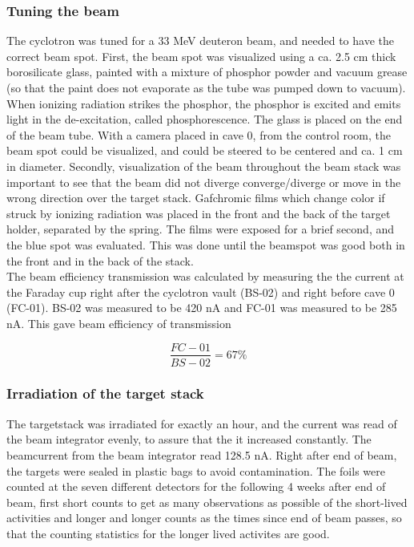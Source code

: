 \documentclass[a4paper,11pt,twoside]{book}
\begin{document}
\subsubsection{Tuning the beam}
The cyclotron was tuned for a 33 MeV deuteron beam, and needed to have the correct beam spot. First, the beam spot was visualized using a ca. 2.5 cm thick borosilicate glass, painted with a mixture of phosphor powder and vacuum grease (so that the paint does not evaporate as the tube was pumped down to vacuum). When ionizing radiation strikes the phosphor, the phosphor is excited and emits light in the de-excitation, called phosphorescence.  The glass is placed on the end of the beam tube. With a camera placed in cave 0, from the control room, the beam spot could be visualized, and could be steered to be centered and ca. 1 cm in diameter. Secondly, visualization of the beam throughout the beam stack was important to see that the beam did not diverge converge/diverge or move in the wrong direction over the target stack. Gafchromic films which change color if struck by ionizing radiation was placed in the front and the back of the target holder, separated by the spring. The films were exposed for a brief second, and the blue spot was evaluated. This was done until the beamspot was good both in the front and in the back of the stack. \\

\noindent
The beam efficiency transmission was calculated by measuring the the current at the Faraday cup right after the cyclotron vault (BS-02) and right before cave 0 (FC-01). BS-02 was measured to be 420 nA and FC-01 was measured to be 285 nA. This gave beam efficiency of transmission

$$\frac{FC-01}{BS-02}=67\% $$

\subsubsection{Irradiation of the target stack}

The targetstack was irradiated for exactly an hour, and the current was read of the beam integrator evenly, to assure that the it increased constantly. The beamcurrent from the beam integrator read 128.5 nA.  %
Right after end of beam, the targets were sealed in plastic bags to avoid contamination. The foils were counted at the seven different detectors for the following 4 weeks after end of beam, first short counts to get as many observations as possible of the short-lived activities and longer and longer counts as the times since end of beam passes, so that the counting statistics for the longer lived activites are good. 
\end{document}

